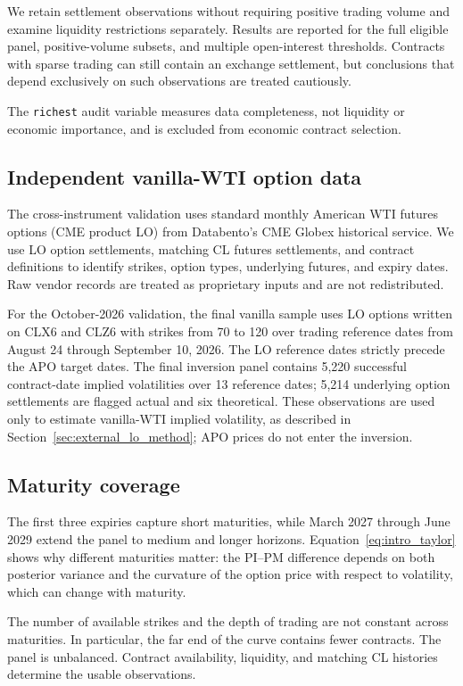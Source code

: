 We retain settlement observations without requiring positive trading volume and examine liquidity restrictions separately. Results are reported for the full eligible panel, positive-volume subsets, and multiple open-interest thresholds. Contracts with sparse trading can still contain an exchange settlement, but conclusions that depend exclusively on such observations are treated cautiously.

The \texttt{richest} audit variable measures data completeness, not liquidity or economic importance, and is excluded from economic contract selection.

\subsection{Independent vanilla-WTI option data}

The cross-instrument validation uses standard monthly American WTI futures options (CME product LO) from Databento's CME Globex historical service. We use LO option settlements, matching CL futures settlements, and contract definitions to identify strikes, option types, underlying futures, and expiry dates. Raw vendor records are treated as proprietary inputs and are not redistributed.

For the October-2026 validation, the final vanilla sample uses LO options written on CLX6 and CLZ6 with strikes from 70 to 120 over trading reference dates from August 24 through September 10, 2026. The LO reference dates strictly precede the APO target dates. The final inversion panel contains 5,220 successful contract-date implied volatilities over 13 reference dates; 5,214 underlying option settlements are flagged actual and six theoretical. These observations are used only to estimate vanilla-WTI implied volatility, as described in Section~\ref{sec:external_lo_method}; APO prices do not enter the inversion.

\subsection{Maturity coverage}

The first three expiries capture short maturities, while March 2027 through June 2029 extend the panel to medium and longer horizons. Equation~\eqref{eq:intro_taylor} shows why different maturities matter: the PI--PM difference depends on both posterior variance and the curvature of the option price with respect to volatility, which can change with maturity.

The number of available strikes and the depth of trading are not constant across maturities. In particular, the far end of the curve contains fewer contracts. The panel is unbalanced. Contract availability, liquidity, and matching CL histories determine the usable observations.
